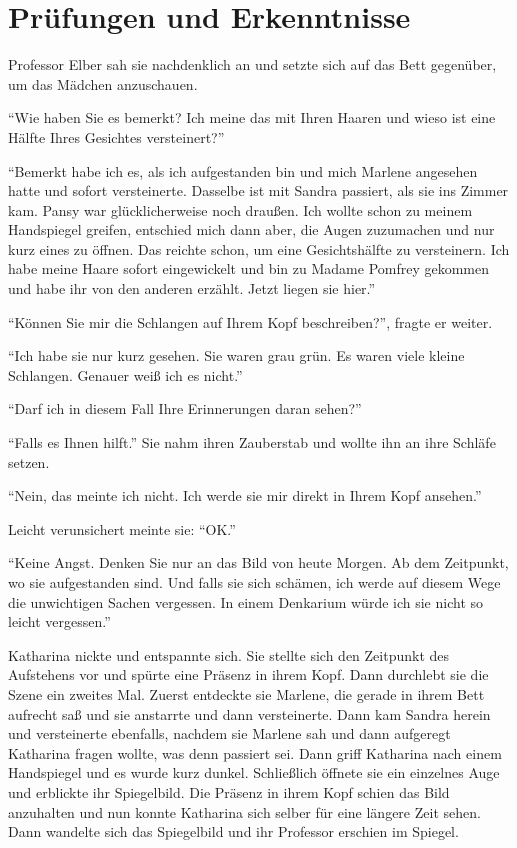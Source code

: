 \chapter{Prüfungen und Erkenntnisse}


Professor Elber sah sie nachdenklich an und setzte sich auf das Bett gegenüber, um das Mädchen anzuschauen.

\enquote{Wie haben Sie es bemerkt? Ich meine das mit Ihren Haaren und wieso ist eine Hälfte Ihres Gesichtes versteinert?}

\enquote{Bemerkt habe ich es, als ich aufgestanden bin und mich Marlene angesehen hatte und sofort versteinerte. Dasselbe ist mit Sandra passiert, als sie ins Zimmer kam. Pansy war glücklicherweise noch draußen. Ich wollte schon zu meinem Handspiegel greifen, entschied mich dann aber, die Augen zuzumachen und nur kurz eines zu öffnen. Das reichte schon, um eine Gesichtshälfte zu versteinern. Ich habe meine Haare sofort eingewickelt und bin zu Madame Pomfrey gekommen und habe ihr von den anderen erzählt. Jetzt liegen sie hier.}

\enquote{Können Sie mir die Schlangen auf Ihrem Kopf beschreiben?}, fragte er weiter.

\enquote{Ich habe sie nur kurz gesehen. Sie waren grau \gst grün. Es waren viele kleine Schlangen. Genauer weiß ich es nicht.}

\enquote{Darf ich in diesem Fall Ihre Erinnerungen daran sehen?}

\enquote{Falls es Ihnen hilft.} Sie nahm ihren Zauberstab und wollte ihn an ihre Schläfe setzen.

\enquote{Nein, das meinte ich nicht. Ich werde sie mir direkt in Ihrem Kopf ansehen.}

Leicht verunsichert meinte sie: \enquote{OK.}

\enquote{Keine Angst. Denken Sie nur an das Bild von heute Morgen. Ab dem Zeitpunkt, wo sie aufgestanden sind. Und falls sie sich schämen, ich werde auf diesem Wege die unwichtigen Sachen vergessen. In einem Denkarium würde ich sie nicht so leicht vergessen.}

Katharina nickte und entspannte sich. Sie stellte sich den Zeitpunkt des Aufstehens vor und spürte eine Präsenz in ihrem Kopf. Dann durchlebt sie die Szene ein zweites Mal. Zuerst entdeckte sie Marlene, die gerade in ihrem Bett aufrecht saß und sie anstarrte und dann versteinerte. Dann kam Sandra herein und versteinerte ebenfalls, nachdem sie Marlene sah und dann aufgeregt Katharina fragen wollte, was denn passiert sei. Dann griff Katharina nach einem Handspiegel und es wurde kurz dunkel. Schließlich öffnete sie ein einzelnes Auge und erblickte ihr Spiegelbild. Die Präsenz in ihrem Kopf schien das Bild anzuhalten und nun konnte Katharina sich selber für eine längere Zeit sehen. Dann wandelte sich das Spiegelbild und ihr Professor erschien im Spiegel.

